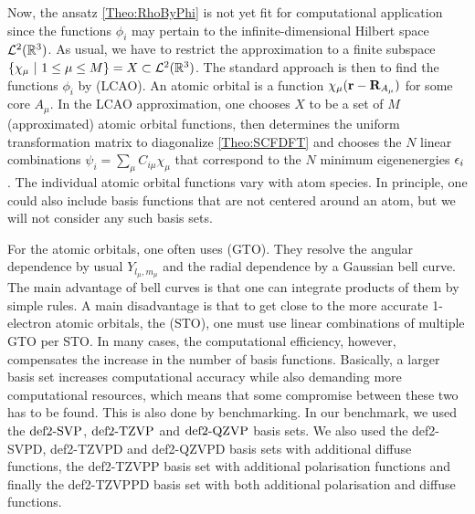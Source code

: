 \documentclass[8.5pt,twoside,twocolumn]{article}
\renewcommand\r{\bo r}
\theoremstyle{standard}
\begin{document}
Now, the ansatz \eqref{Theo:RhoByPhi} is not yet fit for computational application since the
functions $\phi_i$ may pertain to the infinite-dimensional Hilbert space $\mathcal L^2(\mathbb{R}^3)$.
As usual, we have to restrict the approximation to a finite subspace 
$\left\{{\chi_\mu\ |\ 1 \le \mu \le M} \right\} = X \subset \mathcal L^2(\mathbb{R}^3)$.
The standard approach is then to find the functions $\phi_i$ by  (LCAO). An atomic orbital is a function $\chi_\mu(\r - \bo R_{A_\mu})$
for some core $A_\mu$. In the LCAO approximation, one chooses $X$ to be a set of $M$ (approximated) atomic orbital
functions, then determines the uniform transformation matrix to diagonalize \eqref{Theo:SCFDFT}
and chooses the $N$ linear combinations $\psi_i=\sum_\mu C_{i \mu} \chi_\mu$ that correspond to the $N$ minimum
eigenenergies $\epsilon_i$. The individual atomic orbital functions vary with atom species. In principle,
one could also include basis functions that are not centered around an atom, but we will
not consider any such basis sets.

For the atomic orbitals, one often uses  (GTO). They resolve the
angular dependence by usual  $Y_{l_\mu,m_\mu}$ and the
radial dependence by a Gaussian bell curve. The main advantage of bell curves is that one can integrate products
of them by simple rules. A main disadvantage
is that to get close to the more accurate 1-electron atomic orbitals, the 
(STO), one must use linear combinations of multiple GTO per STO. In many cases, the computational
efficiency, however, compensates the increase in the number of basis functions.
Basically, a larger basis set increases computational accuracy while also demanding more
computational resources, which means that some compromise between these two has to
be found. This is also done by benchmarking. In our benchmark, we used the
$\text{def2-SVP}$\cite{SchaeferHornAhlrichs1992},
$\text{def2-TZVP}$\cite{WeigendHaeserPatzeltEtAl1998} and
$\text{def2-QZVP}$\cite{WeigendFurcheAhlrichs2003} basis sets. We also used the def2-SVPD,
def2-TZVPD and def2-QZVPD basis sets with additional diffuse
functions\cite{RappoportFurche2010}, the
def2-TZVPP\cite{WeigendHaeserPatzeltEtAl1998} basis set with additional
polarisation functions and finally the def2-TZVPPD\cite{RappoportFurche2010}
basis set with both additional polarisation and diffuse functions.
\end{document}
